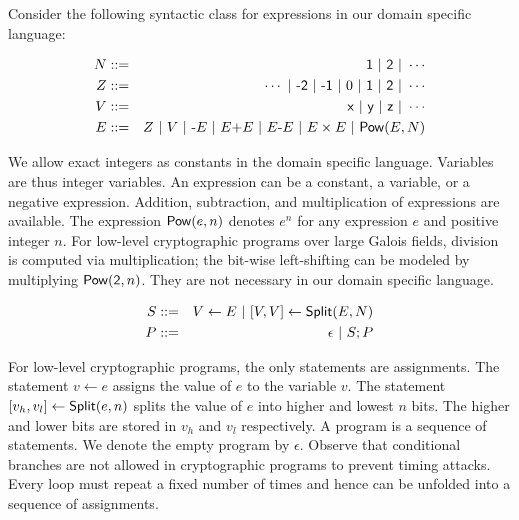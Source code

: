 

Consider the following syntactic class for expressions in our domain
specific language:

\begin{eqnarray*}
  N & ::= & \dslcode{1}\ |\ \dslcode{2}\ |\ \cdots\\
  Z & ::= & \cdots \ |\ \dslcode{-2}\ |\ \dslcode{-1} \ |\ 0\ |\ 
            \dslcode{1}\ |\ \dslcode{2}\ |\ \cdots\\
  V & ::= & \dslcode{x} \ |\ \dslcode{y} \ |\ \dslcode{z} \ |\ \cdots\\
  E & ::= &  Z \ |\ V \ |\  \dslcode{-}E \ |\ E \dslcode{+} E 
             \ |\ E \dslcode{-} E
             \ |\ E \times E \ |\ \dslcode{Pow} (E, N)
\end{eqnarray*}

We allow exact integers as constants in the domain specific
language. Variables are thus integer variables. An expression can be a
constant, a variable, or a negative expression. Addition, subtraction,
and multiplication of expressions are available. The expression
$\mbox{\textsf{Pow}}(e, n)$ denotes $e^n$ for any expression $e$ and positive
integer $n$. For low-level cryptographic programs over large Galois
fields, division is computed via multiplication; the bit-wise
left-shifting can be modeled by multiplying
$\mbox{\textsf{Pow}}(\mbox{\textsf{2}}, n)$. They are not necessary in our
domain specific language. 

\begin{eqnarray*}
  S & ::= & V \leftarrow E 
            \ |\  {[}{V}, {V}{]} \leftarrow \mbox{\textsf{Split}} (E, N)\\
  P & ::= & \epsilon \ |\ S; P
\end{eqnarray*}

For low-level cryptographic programs, the only statements are
assignments. The statement $v \leftarrow e$ assigns the value of $e$
to the variable $v$. The statement ${[}{v_h}, {v_l}{]} \leftarrow
\mbox{\textsf{Split}}(e, n)$ splits the value of $e$ into higher and lowest
$n$ bits. The higher and lower bits are stored in $v_h$ and $v_l$
respectively. A program is a sequence of statements. We denote the
empty program by $\epsilon$. Observe that conditional branches are not
allowed in cryptographic programs to prevent timing attacks. Every
loop must repeat a fixed number of times and hence can be unfolded
into a sequence of assignments.

